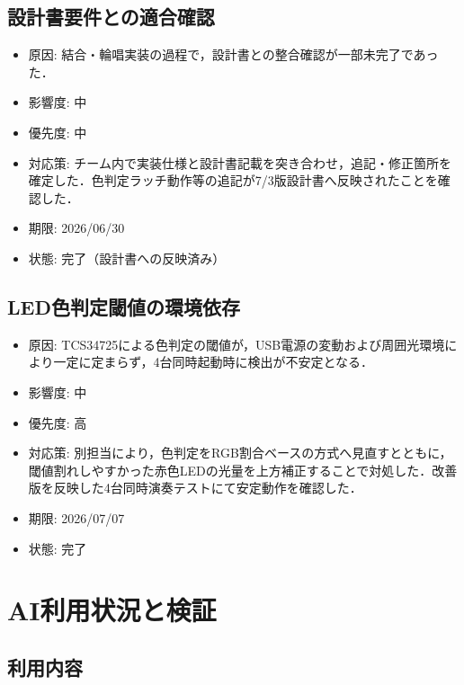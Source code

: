 \documentclass[lualatex,paper=a4paper,jafontsize=11.5pt,jafontscale=1.05]{jlreq}
\begin{document}
\subsection{設計書要件との適合確認}
\begin{itemize}
  \item 原因: 結合・輪唱実装の過程で，設計書との整合確認が一部未完了であった．
  \item 影響度: 中
  \item 優先度: 中
  \item 対応策: チーム内で実装仕様と設計書記載を突き合わせ，追記・修正箇所を確定した．色判定ラッチ動作等の追記が7/3版設計書へ反映されたことを確認した．
  \item 期限: 2026/06/30
  \item 状態: 完了（設計書への反映済み）
\end{itemize}

\subsection{LED色判定閾値の環境依存}
\begin{itemize}
  \item 原因: TCS34725による色判定の閾値が，USB電源の変動および周囲光環境により一定に定まらず，4台同時起動時に検出が不安定となる．
  \item 影響度: 中
  \item 優先度: 高
  \item 対応策: 別担当により，色判定をRGB割合ベースの方式へ見直すとともに，閾値割れしやすかった赤色LEDの光量を上方補正することで対処した．改善版を反映した4台同時演奏テストにて安定動作を確認した．
  \item 期限: 2026/07/07
  \item 状態: 完了
\end{itemize}

\section{AI利用状況と検証}
\subsection{利用内容}
\end{document}

